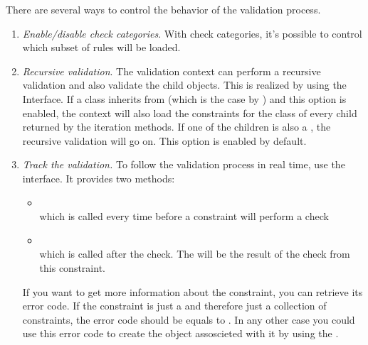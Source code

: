 There are several ways to control the behavior of the validation process.

\begin{enumerate}

\item \emph{Enable/disable check categories}.  With check categories,
  it's possible to control which subset of rules will be loaded. 

\item \emph{Recursive validation}.  The validation context can perform a
  recursive validation and also validate the child objects. This is realized
  by using the \TreeNode Interface. If a class inherits from \TreeNode (which
  is the case by \SBase) and this option is enabled, the context will also
  load the constraints for the class of every child returned by the \TreeNode
  iteration methods. If one of the children is also a \TreeNode, the
  recursive validation will go on. This option is enabled by default.

\item \emph{Track the validation.}  To follow the validation process in real
  time, use the  interface.  It provides two
  methods:

  \begin{itemize}

  \item {} \\ 
    which is called every time before a constraint will perform a check

  \item {} \\
    which is called after the check. The  will be the result of the check from this constraint.

  \end{itemize}

  If you want to get more information about the constraint, you can retrieve
  its error code. If the constraint is just a  and
  therefore just a collection of constraints, the error code should be equals
  to . In any other case you could use
  this error code to create the  object assoscieted with it
  by using the .

\end{enumerate}


